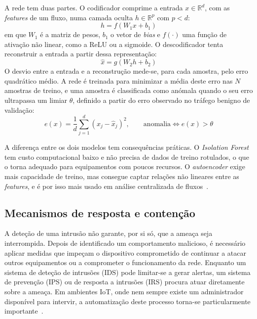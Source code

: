 \documentclass[conference,a4paper]{IEEEtran}
\begin{document}
A rede tem duas partes. O codificador comprime a entrada $x\in\mathbb{R}^d$, com as
\textit{features} de um fluxo, numa camada oculta $h\in\mathbb{R}^p$ com $p<d$:
\begin{equation}
h = f(W_1 x + b_1)
\label{eq:ae_enc}
\end{equation}
em que $W_1$ é a matriz de pesos, $b_1$ o vetor de \textit{bias} e $f(\cdot)$ uma função
de ativação não linear, como a ReLU ou a sigmoide. O descodificador tenta reconstruir a
entrada a partir dessa representação:
\begin{equation}
\hat{x} = g(W_2 h + b_2)
\label{eq:ae_dec}
\end{equation}
O desvio entre a entrada e a reconstrução mede-se, para cada amostra, pelo erro
quadrático médio. A rede é treinada para minimizar a média deste erro nas $N$ amostras
de treino, e uma amostra é classificada como anómala quando o seu erro ultrapassa um
limiar $\theta$, definido a partir do erro observado no tráfego benigno de validação:
\begin{equation}
e(x) = \frac{1}{d}\sum_{j=1}^{d}\left(x_j-\hat{x}_j\right)^2,\qquad
\text{anomalia} \iff e(x) > \theta
\label{eq:ae}
\end{equation}

A diferença entre os dois modelos tem consequências práticas. O \textit{Isolation
Forest} tem custo computacional baixo e não precisa de dados de treino rotulados, o que
o torna adequado para equipamentos com poucos recursos. O \textit{autoencoder} exige mais
capacidade de treino, mas consegue captar relações não lineares entre as
\textit{features}, e é por isso mais usado em análise centralizada de
fluxos~\cite{mirsky2018kitsune,zolotukhin2021curious}.

\subsection{Mecanismos de resposta e contenção}
A deteção de uma intrusão não garante, por si só, que a ameaça seja interrompida. Depois de identificado um comportamento malicioso, é necessário aplicar medidas que impeçam o dispositivo comprometido de continuar a atacar outros equipamentos ou a comprometer o funcionamento da rede. Enquanto um sistema de deteção de intrusões (IDS) pode limitar-se a gerar alertas, um sistema de prevenção (IPS) ou de resposta a intrusões (IRS) procura atuar diretamente sobre a ameaça. Em ambientes IoT, onde nem sempre existe um administrador disponível para intervir, a automatização deste processo torna-se particularmente importante~\cite{kponyo2020lightweight,rose2022ideres}.
\end{document}
